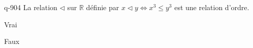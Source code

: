 \begin{truefalse}{q-904}
La relation $\triangleleft$ sur $\mathbb R$ définie par $x\triangleleft y \iff x^3\leq y^3$ est une relation d'ordre.
\item* Vrai
\item Faux
\end{truefalse}

